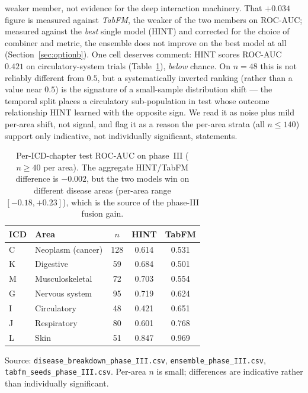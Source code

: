 \documentclass[a4paper,fleqn]{cas-sc}
\begin{document}
weaker member, not evidence for the deep interaction machinery. That $+0.034$ figure is
measured against
\emph{TabFM}, the weaker of the two members on ROC-AUC; measured against the \emph{best}
single model (HINT) and corrected for the choice of combiner and metric, the ensemble does
not improve on the best model at all (Section~\ref{sec:optionb}).
One cell deserves comment: HINT scores ROC-AUC $0.421$ on circulatory-system trials
(Table~\ref{tab:complement}), \emph{below} chance. On $n=48$ this is not reliably different
from $0.5$, but a systematically inverted ranking (rather than a value near $0.5$) is the
signature of a small-sample distribution shift --- the temporal split places a circulatory
sub-population in test whose outcome relationship HINT learned with the opposite sign. We read
it as noise plus mild per-area shift, not signal, and flag it as a reason the per-area strata
(all $n\le140$) support only indicative, not individually significant, statements.
\begin{table}[t]
\centering\small
\caption{Per-ICD-chapter test ROC-AUC on phase~III ($n\ge40$ per area). The aggregate
HINT/TabFM difference is $-0.002$, but the two models win on different disease areas
(per-area range $[-0.18,+0.23]$), which is the source of the phase-III fusion gain.}
\label{tab:complement}
\begin{tabular}{llccc}
\toprule
ICD & Area & $n$ & HINT & TabFM \\
\midrule
C & Neoplasm (cancer) & 128 & 0.614 & 0.531 \\
K & Digestive         & 59  & 0.684 & 0.501 \\
M & Musculoskeletal   & 72  & 0.703 & 0.554 \\
G & Nervous system    & 95  & 0.719 & 0.624 \\
I & Circulatory       & 48  & 0.421 & 0.651 \\
J & Respiratory       & 80  & 0.601 & 0.768 \\
L & Skin              & 51  & 0.847 & 0.969 \\
\bottomrule
\end{tabular}
\begin{minipage}{\linewidth}\vspace{2pt}\scriptsize Source: \texttt{disease\_breakdown\_phase\_III.csv}, \texttt{ensemble\_phase\_III.csv}, \texttt{tabfm\_seeds\_phase\_III.csv}. Per-area $n$ is small; differences are indicative rather than individually significant. \end{minipage}
\end{table}
\end{document}
